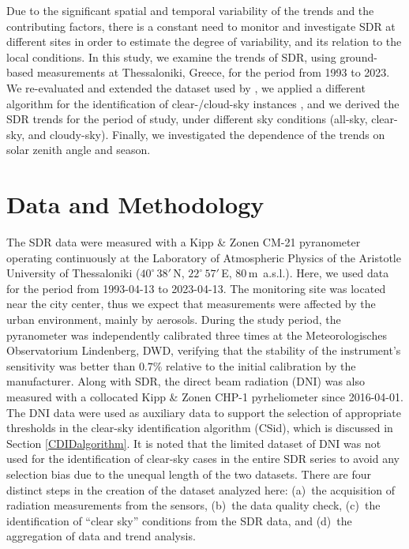 \documentclass[applsci,article,submit,moreauthors,pdftex]{Definitions/mdpi}
\begin{document}
Due to the significant spatial and temporal variability of the trends
and the contributing factors, there is a constant need to monitor and
investigate SDR at different sites in order to estimate the degree of
variability, and its relation to the local conditions. In this study, we
examine the trends of SDR, using ground-based measurements at
Thessaloniki, Greece, for the period from 1993 to 2023. We re-evaluated
and extended the dataset used by \citet{Bais2013}, we applied a
different algorithm for the identification of clear-/cloud-sky instances
\citep{Reno2016, Reno2012}, and we derived the SDR trends for the period
of study, under different sky conditions (all-sky, clear-sky, and
cloudy-sky). Finally, we investigated the dependence of the trends on
solar zenith angle and season.

\hypertarget{data-and-methodology}{%
\section{Data and Methodology}\label{data-and-methodology}}

The SDR data were measured with a Kipp \& Zonen CM-21 pyranometer
operating continuously at the Laboratory of Atmospheric Physics of the
Aristotle University of Thessaloniki (\(40^\circ\,38'\,\)N,
\(22^\circ\,57'\,\)E, \(80\,\)m~a.s.l.). Here, we used data for the
period from 1993-04-13 to 2023-04-13. The monitoring site was located
near the city center, thus we expect that measurements were affected by
the urban environment, mainly by aerosols. During the study period, the
pyranometer was independently calibrated three times at the
Meteorologisches Observatorium Lindenberg, DWD, verifying that the
stability of the instrument's sensitivity was better than \(0.7\%\)
relative to the initial calibration by the manufacturer. Along with SDR,
the direct beam radiation (DNI) was also measured with a collocated Kipp
\& Zonen CHP-1 pyrheliometer since 2016-04-01. The DNI data were used as
auxiliary data to support the selection of appropriate thresholds in the
clear-sky identification algorithm (CSid), which is discussed in Section
\ref{CDIDalgorithm}. It is noted that the limited dataset of DNI was not
used for the identification of clear-sky cases in the entire SDR series
to avoid any selection bias due to the unequal length of the two
datasets. There are four distinct steps in the creation of the dataset
analyzed here: (a)~the acquisition of radiation measurements from the
sensors, (b)~the data quality check, (c)~the identification of ``clear
sky'' conditions from the SDR data, and (d)~the aggregation of data and
trend analysis.
\end{document}
